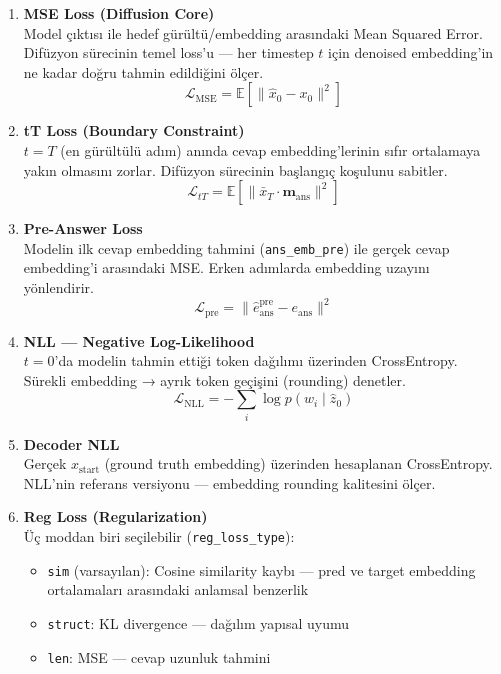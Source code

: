 \documentclass[12pt, a4paper]{article}
\begin{document}
\begin{enumerate}

\item \textbf{MSE Loss (Diffusion Core)}\\
Model çıktısı ile hedef gürültü/embedding arasındaki Mean Squared Error.
Difüzyon sürecinin temel loss'u — her timestep $t$ için denoised embedding'in
ne kadar doğru tahmin edildiğini ölçer.
\[
\mathcal{L}_{\text{MSE}} = \mathbb{E}\left[\|\hat{x}_0 - x_0\|^2\right]
\]

\item \textbf{tT Loss (Boundary Constraint)}\\
$t = T$ (en gürültülü adım) anında cevap embedding'lerinin sıfır ortalamaya
yakın olmasını zorlar. Difüzyon sürecinin başlangıç koşulunu sabitler.
\[
\mathcal{L}_{tT} = \mathbb{E}\left[\|\bar{x}_T \cdot \mathbf{m}_{\text{ans}}\|^2\right]
\]

\item \textbf{Pre-Answer Loss}\\
Modelin ilk cevap embedding tahmini (\texttt{ans\_emb\_pre}) ile gerçek cevap
embedding'i arasındaki MSE. Erken adımlarda embedding uzayını yönlendirir.
\[
\mathcal{L}_{\text{pre}} = \|\hat{e}_{\text{ans}}^{\text{pre}} - e_{\text{ans}}\|^2
\]

\item \textbf{NLL — Negative Log-Likelihood}\\
$t = 0$'da modelin tahmin ettiği token dağılımı üzerinden CrossEntropy.
Sürekli embedding → ayrık token geçişini (rounding) denetler.
\[
\mathcal{L}_{\text{NLL}} = -\sum_i \log p(w_i \mid \hat{z}_0)
\]

\item \textbf{Decoder NLL}\\
Gerçek $x_{\text{start}}$ (ground truth embedding) üzerinden hesaplanan
CrossEntropy. NLL'nin referans versiyonu — embedding rounding kalitesini ölçer.

\item \textbf{Reg Loss (Regularization)}\\
Üç moddan biri seçilebilir (\texttt{reg\_loss\_type}):
\begin{itemize}
  \item \texttt{sim} (varsayılan): Cosine similarity kaybı — pred ve target
        embedding ortalamaları arasındaki anlamsal benzerlik
  \item \texttt{struct}: KL divergence — dağılım yapısal uyumu
  \item \texttt{len}: MSE — cevap uzunluk tahmini
\end{itemize}

\end{enumerate}
\end{document}
